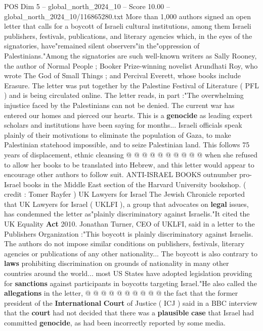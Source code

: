 \begin{textsample}{POS Dim 5 – global\_north\_2024\_10 – Score 10.00 – global\_north\_2024\_10/116865280.txt}  \label{ex:f5_pos_409}
More than 1,000 authors signed an open letter that calls for a boycott of Israeli cultural institutions, among them Israeli publishers, festivals, publications, and literary agencies which, in the eyes of the signatories, have"remained silent observers"in the"oppression of Palestinians."Among the signatories are such well-known writers as Sally Rooney, the author of Normal People ; Booker Prize-winning novelist Arundhati Roy, who wrote The God of Small Things ; and Percival Everett, whose books include Erasure.
The letter was put together by the Palestine Festival of Literature ( PFL ) and is being circulated online.
The letter reads, in part :"The overwhelming injustice faced by the Palestinians can not be denied.
The current war has entered our homes and pierced our hearts.
This is a \textbf{genocide} as leading expert scholars and institutions have been saying for months...
Israeli officials speak plainly of their motivations to eliminate the population of Gaza, to make Palestinian statehood impossible, and to seize Palestinian land.
This follows 75 years of displacement, ethnic cleansing @ @ @ @ @ @ @ @ @ @ when she refused to allow her books to be translated into Hebrew, and this letter would appear to encourage other authors to follow suit.
ANTI-ISRAEL BOOKS outnumber pro-Israel books in the Middle East section of the Harvard University bookshop. ( credit : Tomer Rayfer ) UK Lawyers for Israel The Jewish Chronicle reported that UK Lawyers for Israel ( UKLFI ), a group that advocates on \textbf{legal} issues, has condemned the letter as"plainly discriminatory against Israelis."It cited the UK Equality \textbf{Act} 2010.
Jonathan Turner, CEO of UKLFI, said in a letter to the Publishers Organization :"This boycott is plainly discriminatory against Israelis.
The authors do not impose similar conditions on publishers, festivals, literary agencies or publications of any other nationality...
The boycott is also contrary to \textbf{laws} prohibiting discrimination on grounds of nationality in many other countries around the world... most US States have adopted legislation providing for \textbf{sanctions} against participants in boycotts targeting Israel."He also called the \textbf{allegations} in the letter, @ @ @ @ @ @ @ @ @ @ the fact that the former president of the \textbf{International} \textbf{Court} of Justice ( ICJ ) said in a BBC interview that the \textbf{court} had not decided that there was a \textbf{plausible} \textbf{case} that Israel had committed \textbf{genocide}, as had been incorrectly reported by some media.

\end{textsample}
